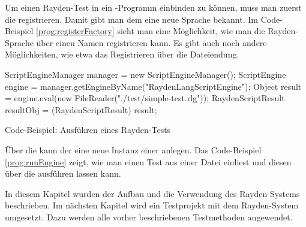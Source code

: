 \SuperPar
Um einen Rayden-Test in ein -Programm einbinden zu können, muss man zuerst die  registrieren. Damit gibt man dem  eine neue Sprache bekannt. Im Code-Beispiel \ref{prog:registerFactory} sieht man eine Möglichkeit, wie man die Rayden-Sprache über einen Namen registrieren kann. Es gibt auch noch andere Möglichkeiten, wie etwa das Registrieren über die Dateiendung.

\begin{program}
\begin{JavaCode}
ScriptEngineManager manager = new ScriptEngineManager();
ScriptEngine engine = manager.getEngineByName("RaydenLangScriptEngine");
Object result =  engine.eval(new FileReader("./test/simple-test.rlg"));
RaydenScriptResult resultObj = (RaydenScriptResult) result;
\end{JavaCode}
\caption{Code-Beispiel: Ausführen eines Rayden-Tests}
\label{prog:runEngine}
\end{program}

\SuperPar
Über die  kann der  eine neue Instanz einer  anlegen. Das Code-Beispiel \ref{prog:runEngine} zeigt, wie man einen Test aus einer Datei einliest und diesen über die  ausführen lassen kann.

\SuperPar
In diesem Kapitel wurden der Aufbau und die Verwendung des Rayden-Systems beschrieben. Im nächsten Kapitel wird ein Testprojekt mit dem Rayden-System umgesetzt. Dazu werden alle vorher beschriebenen Testmethoden angewendet.

